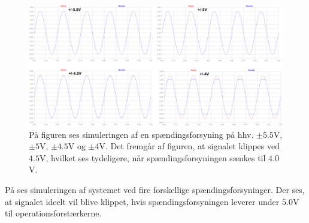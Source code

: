 \begin{figure}[H]
	\centering
	\includegraphics[scale=0.17]{figures/cProblemloesning/Spaendingsforsyning2.PNG}
	\caption{På figuren ses simuleringen af en spændingsforsyning på hhv. $\pm5.5$V, $\pm5$V, $\pm4.5$V og $\pm4$V. Det fremgår af figuren, at signalet klippes ved $4.5$V, hvilket ses tydeligere, når spændingsforsyningen sænkes til $4.0$V.}
	\label{fig:spaendingsforsyning_graf}
\end{figure}
\noindent På  ses simuleringen af systemet ved fire forskellige spændingsforsyninger. Der ses, at signalet ideelt vil blive klippet, hvis spændingsforsyningen leverer under $5.0$V til operationsforstærkerne.

